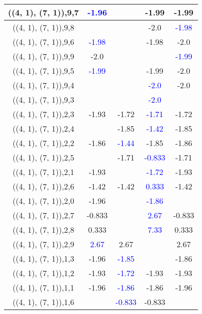 \documentclass{article}
\begin{document}
\begin{center}
\begin{longtable}{|c|c|c|c|c|}
        	\hline
        	((4, 1), (7, 1)),9,7& \textcolor{blue}{-1.96}&&-1.99&-1.99\\
        	\hline
        	((4, 1), (7, 1)),9,8&&&-2.0& \textcolor{blue}{-1.98}\\
        	\hline
        	((4, 1), (7, 1)),9,6& \textcolor{blue}{-1.98}&&-1.98&-2.0\\
        	\hline
        	((4, 1), (7, 1)),9,9&-2.0&&& \textcolor{blue}{-1.99}\\
        	\hline
        	((4, 1), (7, 1)),9,5& \textcolor{blue}{-1.99}&&-1.99&-2.0\\
        	\hline
        	((4, 1), (7, 1)),9,4&&& \textcolor{blue}{-2.0}&-2.0\\
        	\hline
        	((4, 1), (7, 1)),9,3&&& \textcolor{blue}{-2.0}&\\
        	\hline
        	((4, 1), (7, 1)),2,3&-1.93&-1.72& \textcolor{blue}{-1.71}&-1.72\\
        	\hline
        	((4, 1), (7, 1)),2,4&&-1.85& \textcolor{blue}{-1.42}&-1.85\\
        	\hline
        	((4, 1), (7, 1)),2,2&-1.86& \textcolor{blue}{-1.44}&-1.85&-1.86\\
        	\hline
        	((4, 1), (7, 1)),2,5&&-1.71& \textcolor{blue}{-0.833}&-1.71\\
        	\hline
        	((4, 1), (7, 1)),2,1&-1.93&& \textcolor{blue}{-1.72}&-1.93\\
        	\hline
        	((4, 1), (7, 1)),2,6&-1.42&-1.42& \textcolor{blue}{0.333}&-1.42\\
        	\hline
        	((4, 1), (7, 1)),2,0&-1.96&& \textcolor{blue}{-1.86}&\\
        	\hline
        	((4, 1), (7, 1)),2,7&-0.833&& \textcolor{blue}{2.67}&-0.833\\
        	\hline
        	((4, 1), (7, 1)),2,8&0.333&& \textcolor{blue}{7.33}&0.333\\
        	\hline
        	((4, 1), (7, 1)),2,9& \textcolor{blue}{2.67}&2.67&&2.67\\
        	\hline
        	((4, 1), (7, 1)),1,3&-1.96& \textcolor{blue}{-1.85}&&-1.86\\
        	\hline
        	((4, 1), (7, 1)),1,2&-1.93& \textcolor{blue}{-1.72}&-1.93&-1.93\\
        	\hline
        	((4, 1), (7, 1)),1,1&-1.96& \textcolor{blue}{-1.86}&-1.86&-1.96\\
        	\hline
        	((4, 1), (7, 1)),1,6&& \textcolor{blue}{-0.833}&-0.833&\\

\end{longtable}
\end{center}
\end{document}
